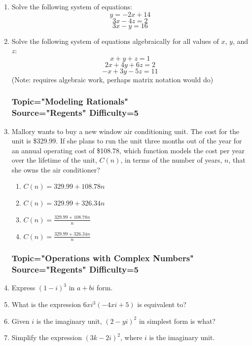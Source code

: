 \documentclass[12pt, oneside]{article}
\begin{document}
\begin{enumerate}
\item Solve the following system of equations:
\[y=-2x+14\]
\[3x - 4z = 2\]
\[3x - y  = 16\]

\item Solve the following system of equations algebraically for all values of $x$, $y$, and $z$:
\[x +y+ z=1\]
\[2x+4y+6z=2\]
\[-x+3y-5z=11\]
(Note: requires algebraic work, perhaps matrix notation would do)

\subsubsection*{Topic="Modeling Rationals"\\
Source="Regents" 
Difficulty=5}

\item Mallory wants to buy a new window air conditioning unit. The cost for the unit is \$329.99. If she plans to run the unit three months out of the year for an annual operating cost of \$108.78, which function models the cost per year over the lifetime of the unit, $C(n)$, in terms of the number of years, $n$, that she owns the air conditioner?
\begin{enumerate}
    \item $C(n)=329.99+108.78n$
    \item $C(n)=329.99+326.34n$
    \item $\displaystyle C(n)=\frac{329.99+108.78n}{n}$
    \item $\displaystyle C(n)=\frac{329.99+326.34n}{n}$
\end{enumerate} %

\subsubsection*{Topic="Operations with Complex Numbers"\\
Source="Regents" 
Difficulty=5}

\item Express $(1-i)^3$ in $a+bi$ form. %

\item What is the expression $6xi^3(-4xi+5)$ is equivalent to?  %

\item Given $i$ is the imaginary unit, $(2-yi)^2$ in simplest form is what? %

\item Simplify the expression $(3k - 2i)^2$, where $i$ is the imaginary unit. %



\end{enumerate}
\end{document}

